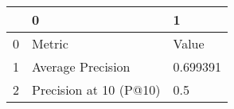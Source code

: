 \begin{tabular}{lll}
\toprule
{} &                       0 &         1 \\
\midrule
0 &                  Metric &     Value \\
1 &       Average Precision &  0.699391 \\
2 &  Precision at 10 (P@10) &       0.5 \\
\bottomrule
\end{tabular}
